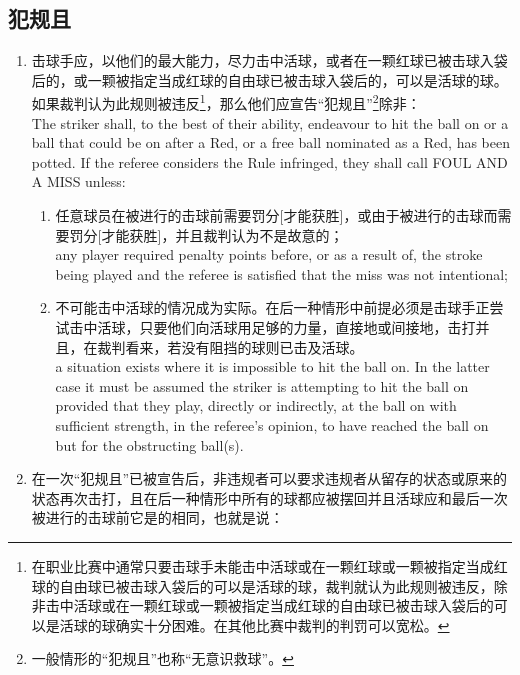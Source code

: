 \subsection{犯规且\miss{}}\label{22314}

\begin{enumerate}[label=(\alph*)]
    \item \label{22314a}击球手应，以他们的最大能力，尽力击中活球，或者在一颗红球已被击球入袋后的，或一颗被指定当成红球的自由球已被击球入袋后的，可以是活球的球。如果裁判认为此规则被违反\footnote{在职业比赛中通常只要击球手未能击中活球或在一颗红球或一颗被指定当成红球的自由球已被击球入袋后的可以是活球的球，裁判就认为此规则被违反，除非击中活球或在一颗红球或一颗被指定当成红球的自由球已被击球入袋后的可以是活球的球确实十分困难。在其他比赛中裁判的判罚可以宽松。}，那么他们应宣告“犯规且\miss{}”\footnote{一般情形的“犯规且\miss{}”也称“无意识救球”。}除非：\\
    The striker shall, to the best of their ability, endeavour to hit the ball on or a ball that could be on after a Red, or a free ball nominated as a Red, has been potted. If the referee considers the Rule infringed, they shall call FOUL AND A MISS unless:
    \begin{enumerate}[label=(\roman*)]
        \item \label{22314ai}任意球员在被进行的击球前需要罚分[才能获胜]，或由于被进行的击球而需要罚分[才能获胜]，并且裁判认为\miss{}不是故意的；\\
        any player required penalty points before, or as a result of, the stroke being played and the referee is satisfied that the miss was not intentional;
        \item 不可能击中活球的情况成为实际。在后一种情形中前提必须是击球手正尝试击中活球，只要他们向活球用足够的力量，直接地或间接地，击打并且，在裁判看来，若没有阻挡的球则已击及活球。\\
        a situation exists where it is impossible to hit the ball on. In the latter case it must be assumed the striker is attempting to hit the ball on provided that they play, directly or indirectly, at the ball on with sufficient strength, in the referee's opinion, to have reached the ball on but for the obstructing ball(s).
    \end{enumerate}
    \item \label{22314b}在一次“犯规且\miss{}”已被宣告后，非违规者可以要求违规者从留存的状态或原来的状态再次击打，且在后一种情形中所有的球都应被摆回并且活球应和最后一次被进行的击球前它是的相同，也就是说：\\

\end{enumerate}
